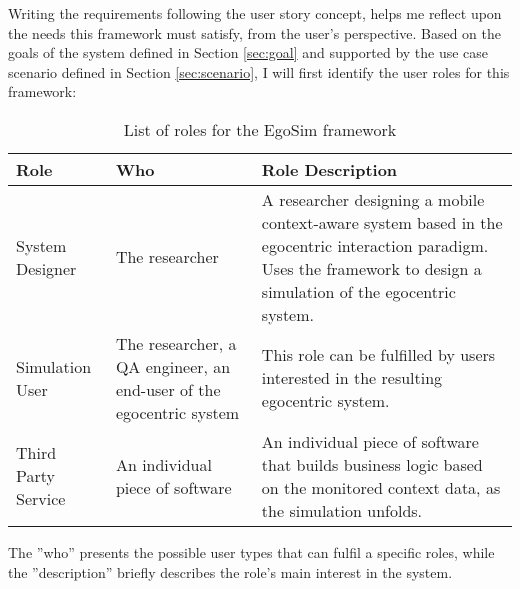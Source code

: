Writing the requirements following the user story concept, helps me reflect upon the needs this framework must satisfy, from the user's perspective. Based on the goals of the system defined in Section \ref{sec:goal} and supported by the use case scenario defined in Section \ref{sec:scenario}, I will first identify the user roles for this framework:
\begin{table}[H]
	\begin{center}
		\small \begin{tabular*}{1.1\columnwidth}{p{3cm}p{3cm}p{5.5cm}} 
			\\ \hline \hline
			Role & Who & Role Description \\ \hline \hline

		 	System Designer & The researcher & A researcher designing a mobile context-aware system based in the egocentric interaction paradigm. Uses the framework to design a simulation of the egocentric system.\\ \hline

		 	Simulation User & The researcher, a QA engineer, an end-user of the egocentric system & This role can be fulfilled by users interested in the resulting egocentric system.\\ \hline

		 	Third Party Service & An individual piece of software & An individual piece of software that builds business logic based on the monitored context data, as the simulation unfolds.\\ \hline
		\end{tabular*}
		
		\caption{List of roles for the EgoSim framework}
		\label{table:roles}
	\end{center}
\end{table}
The ''who'' presents the possible user types that can fulfil a specific roles, while the ''description'' briefly describes the role's main interest in the system.\\

